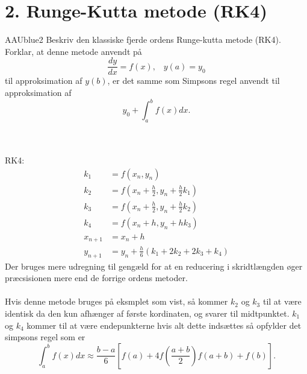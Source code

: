 \section*{2. Runge-Kutta metode (RK4)}
% 
%
\begin{color}{AAUblue2}
%
Beskriv den klassiske fjerde ordens Runge-kutta metode (RK4). 
Forklar, at denne metode anvendt på
$$\frac{dy}{dx}=f(x), \phantom{...}y(a)=y_0$$
til approksimation af $y(b)$, er det samme som Simpsons regel anvendt til approksimation af 
$$y_0+\int^b_a f(x)dx. $$
% 
\end{color}
\\\\
RK4:\\
\begin{align*}
k_1&=f(x_n,y_n)\\
k_2&=f(x_n+\frac{h}{2},y_n+\frac{h}{2}k_1)\\
k_3&=f(x_n+\frac{h}{2},y_n+\frac{h}{2}k_2)\\
k_4&=f(x_n+h,y_n+h k_3)\\
x_{n+1}&=x_n+h\\
y_{n+1}&=y_n+\frac{h}{6}(k_1+2k_2+2k_3+k_4)
\end{align*}
Der bruges mere udregning til gengæld for at en reducering i skridtlængden øger præcsisionen mere end de forrige ordens metoder.\\\\
% 
%
Hvis denne metode bruges på eksmplet som vist, så kommer $k_2$ og $k_3$ til at være identisk da den kun afhænger af første kordinaten, og svarer til midtpunktet. $k_1$ og $k_4$ kommer til at være endepunkterne hvis alt dette indsættes så opfylder det simpsons regel som er 
$$\int_a^bf(x)dx \approx \frac{b-a}{6} \left[ f(a)+4f \left( \frac{a+b}{2} \right) f(a+b)+f(b) \right].$$

